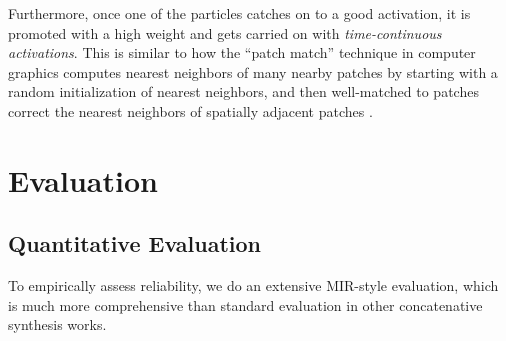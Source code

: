 \documentclass{article}
\begin{document}
Furthermore, once one of the particles catches on to a good activation, it is promoted with a high weight and gets carried on with {\em time-continuous activations}.  This is similar to how the ``patch match'' technique in computer graphics \cite{Barnes:2009:PAR, Barnes:2010:TGP} computes nearest neighbors of many nearby patches by starting with a random initialization of nearest neighbors, and then well-matched to patches correct the nearest neighbors of  spatially adjacent patches \cite{Barnes:2009:PAR}.








\section{Evaluation}
\label{sec:evaluation}

\subsection{Quantitative Evaluation}
\label{sec:quantitativeevaluation}

To empirically assess reliability, we do an extensive MIR-style evaluation, which is much more comprehensive than standard evaluation in other concatenative synthesis works.
\end{document}
